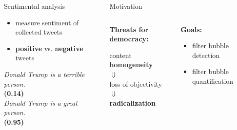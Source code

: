 \documentclass[landscape,a0paper,fontscale=0.285]{baposter} %
\begin{document}
\begin{poster}
\begin{columns}[T]
\begin{column}{.33\textwidth}
\begin{block}{Sentimental analysis}
\begin{itemize}
    \item measure sentiment of collected tweets
    \item \textbf{positive} vs. \textbf{negative} tweets
\end{itemize}
\center
\textit{Donald Trump is a terrible person.}\\
\textbf{(0.14)}\\
\vspace{0.5cm}
\textit{Donald Trump is a great person.}\\
\textbf{(0.95)}
\end{block}

\end{column}
\begin{column}{.63\textwidth}
    \begin{customalertblock}{Motivation}
        \begin{columns}
            \begin{column}{.5\textwidth}
                \begin{large}\textbf{Threats for democracy:}\end{large}
                \vspace{0.5cm}
                \center
                content \textbf{homogeneity}\\
                $\Downarrow$\\
                loss of objectivity\\
                $\Downarrow$\\
                \textbf{radicalization}
            \end{column}
            \begin{column}{.5\textwidth}
                \begin{large}\textbf{Goals:}\end{large}
                \vspace{0.5cm}
                \begin{itemize}
                    \item filter bubble detection
                    \item filter bubble quantification
                \end{itemize}
            \end{column}
        \end{columns}
    \end{customalertblock}
\end{column}
\end{columns}









\end{poster}
\end{document}
